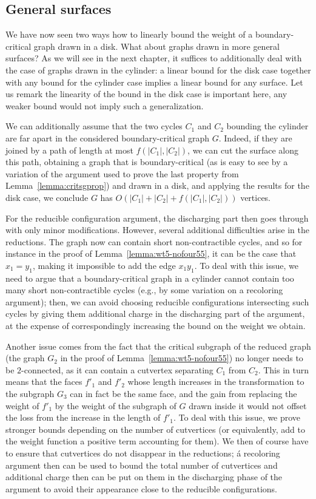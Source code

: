 \documentclass[12pt,twoside,openright,a4paper]{book}
\begin{document}
\subsection{General surfaces}

We have now seen two ways how to linearly bound the weight of a boundary-critical graph drawn in a disk.
What about graphs drawn in more general surfaces?  As we will see in the next chapter, it suffices to additionally
deal with the case of graphs drawn in the cylinder: a linear bound for the disk case together with any bound
for the cylinder case implies a linear bound for any surface.  Let us remark the linearity of the bound in the disk
case is important here, any weaker bound would not imply such a generalization.

We can additionally assume that the two cycles $C_1$ and $C_2$ bounding the cylinder are far apart in the considered
boundary-critical graph $G$.  Indeed, if they are joined by a path of length at most $f(|C_1|,|C_2|)$, we can cut the surface along this path,
obtaining a graph that is boundary-critical (as is easy to see by a variation of the argument used to prove the last
property from Lemma~\ref{lemma:critsgprop}) and drawn in a disk, and applying the results for the disk case,
we conclude $G$ has $O(|C_1|+|C_2|+f(|C_1|,|C_2|))$ vertices.

For the reducible configuration argument, the discharging part then goes through with only minor modifications.
However, several additional difficulties arise in the reductions.  The graph now can contain short non-contractible
cycles, and so for instance in the proof of Lemma~\ref{lemma:wt5-nofour55}, it can be the case that $x_1=y_1$,
making it impossible to add the edge $x_1y_1$.  To deal with this issue, we need to argue that a boundary-critical
graph in a cylinder cannot contain too many short non-contractible cycles (e.g., by some variation on a recoloring argument);
then, we can avoid choosing reducible configurations intersecting such cycles by giving them additional charge in the
discharging part of the argument, at the expense of correspondingly increasing the bound on the weight we obtain.

Another issue comes from the fact that the critical subgraph of the reduced graph (the graph $G_2$ in the proof
of Lemma~\ref{lemma:wt5-nofour55}) no longer needs to be $2$-connected, as it can contain a cutvertex separating $C_1$ from $C_2$.
This in turn means that the faces $f'_1$ and $f'_2$ whose length increases in the transformation to the subgraph $G_3$
can in fact be the same face, and the gain from replacing the weight of $f'_1$ by the weight of the subgraph of $G$ drawn
inside it would not offset the loss from the increase in the length of $f'_1$.  To deal with this issue, we prove
stronger bounds depending on the number of cutvertices (or equivalently, add to the weight function a positive
term accounting for them).  We then of course have to ensure that cutvertices do not disappear in the reductions;
á recoloring argument then can be used to bound the total number of cutvertices and additional charge then can be put on them
in the discharging phase of the argument to avoid their appearance close to the reducible configurations.
\end{document}
